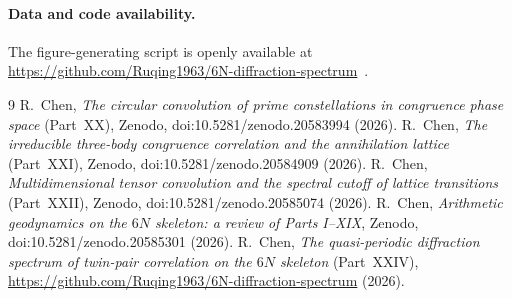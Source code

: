 \documentclass[11pt,a4paper]{article}
\begin{document}
\paragraph{Data and code availability.}
The figure-generating script is openly available at
\url{https://github.com/Ruqing1963/6N-diffraction-spectrum}~\cite{repo}.

\begin{thebibliography}{9}
 R.~Chen, \emph{The circular convolution of prime constellations
in congruence phase space} (Part~XX), Zenodo, doi:10.5281/zenodo.20583994 (2026).
 R.~Chen, \emph{The irreducible three-body congruence correlation
and the annihilation lattice} (Part~XXI), Zenodo, doi:10.5281/zenodo.20584909 (2026).
 R.~Chen, \emph{Multidimensional tensor convolution and the
spectral cutoff of lattice transitions} (Part~XXII), Zenodo,
doi:10.5281/zenodo.20585074 (2026).
 R.~Chen, \emph{Arithmetic geodynamics on the $6N$ skeleton: a
review of Parts I--XIX}, Zenodo, doi:10.5281/zenodo.20585301 (2026).
 R.~Chen, \emph{The quasi-periodic diffraction spectrum of twin-pair
correlation on the $6N$ skeleton} (Part~XXIV),
\url{https://github.com/Ruqing1963/6N-diffraction-spectrum} (2026).
\end{thebibliography}
\end{document}
